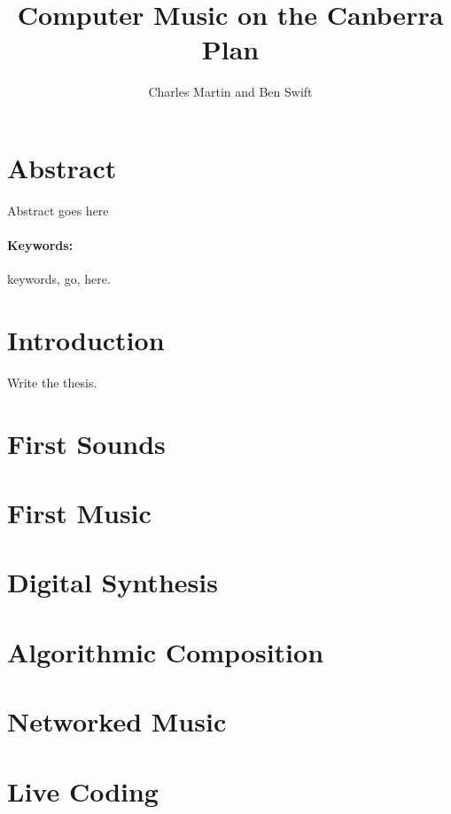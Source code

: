 \documentclass[a4paper,12pt,oldfontcommands]{memoir}
\title{Computer Music on the Canberra Plan}
\author{Charles Martin and Ben Swift}
\begin{document}
\frontmatter
\maketitle

\pagebreak
\tableofcontents
\vfill
\pagebreak
\printglossary[type=\acronymtype,title=Abbreviations]
\vfill

\chapter{Abstract}\label{abstract}

Abstract goes here

\subsubsection{Keywords:} 
keywords, go, here.

\mainmatter

\chapter{Introduction}

Write the thesis.

\chapter{First Sounds}

\chapter{First Music}

\chapter{Digital Synthesis}

\chapter{Algorithmic Composition}

\chapter{Networked Music}

\chapter{Live Coding}
\end{document}
